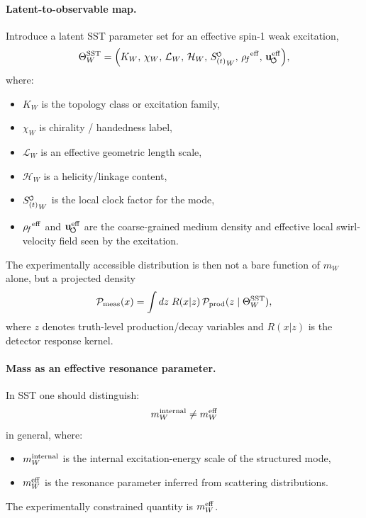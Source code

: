 \documentclass[11pt]{article}
\theoremstyle{definition}
\theoremstyle{plain}
\theoremstyle{remark}
\newcommand{\swirlarrow}{\mathchoice{\mkern-2mu\scriptstyle\boldsymbol{\circlearrowleft}}{\mkern-2mu\scriptstyle\boldsymbol{\circlearrowleft}}{\mkern-2mu\scriptscriptstyle\boldsymbol{\circlearrowleft}}{\mkern-2mu\scriptscriptstyle\boldsymbol{\circlearrowleft}}}
\newcommand{\rhoF}{{\rho_{\!f}}}
\newcommand{\SwirlClock}{{S_{(t)}^{\swirlarrow}}}
\newcommand{\uswirl}{\mathbf{u}_{\!\boldsymbol{\circlearrowleft}}}
\begin{document}
        \paragraph{Latent-to-observable map.}
            Introduce a latent SST parameter set for an effective spin-1 weak excitation,
            \begin{equation}
                \Theta_{W}^{\rm SST}
                =
                \Bigl(
                K_W,\,
                \chi_W,\,
                \mathcal{L}_W,\,
                \mathcal{H}_W,\,
                \SwirlClock_W,\,
                \rhoF^{\rm eff},\,
                \uswirl^{\rm eff}
                \Bigr),
            \end{equation}
            where:
            \begin{itemize}
                \item $K_W$ is the topology class or excitation family,
                \item $\chi_W$ is chirality / handedness label,
                \item $\mathcal{L}_W$ is an effective geometric length scale,
                \item $\mathcal{H}_W$ is a helicity/linkage content,
                \item $\SwirlClock_W$ is the local clock factor for the mode,
                \item $\rhoF^{\rm eff}$ and $\uswirl^{\rm eff}$ are the coarse-grained medium density and effective local swirl-velocity field seen by the excitation.
            \end{itemize}
            
            The experimentally accessible distribution is then not a bare function of $m_W$ alone, but a projected density
            \begin{equation}
                \mathcal{P}_{\rm meas}(x)
                =
                \int dz\; R(x|z)\,\mathcal{P}_{\rm prod}(z\mid \Theta_W^{\rm SST}),
                \label{eq:sst-forward-map}
            \end{equation}
            where $z$ denotes truth-level production/decay variables and $R(x|z)$ is the detector response kernel.
    
        \paragraph{Mass as an effective resonance parameter.}
            In SST one should distinguish:
            \begin{equation}
                m_W^{\rm internal}
                \neq
                m_W^{\rm eff}
            \end{equation}
            in general, where:
            \begin{itemize}
                \item $m_W^{\rm internal}$ is the internal excitation-energy scale of the structured mode,
                \item $m_W^{\rm eff}$ is the resonance parameter inferred from scattering distributions.
            \end{itemize}
            The experimentally constrained quantity is $m_W^{\rm eff}$.
            
\end{document}

